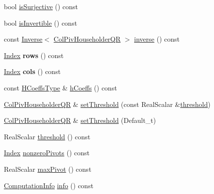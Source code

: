 \begin{DoxyCompactItemize}
bool \hyperlink{group___q_r___module_a87a7d06e0b0479e5b56b19c2a4f56365}{is\+Surjective} () const
\item 
bool \hyperlink{group___q_r___module_a945720f8d683f8ebe97fa807edd3142a}{is\+Invertible} () const
\item 
const \hyperlink{class_eigen_1_1_inverse}{Inverse}$<$ \hyperlink{group___q_r___module_class_eigen_1_1_col_piv_householder_q_r}{Col\+Piv\+Householder\+QR} $>$ \hyperlink{group___q_r___module_a31c45402e74774d9cd13af0e57a6b72f}{inverse} () const
\item 
\mbox{\label{group___q_r___module_a7b149d8acc35378384bd8cd1b7335545}} 
\hyperlink{namespace_eigen_a62e77e0933482dafde8fe197d9a2cfde}{Index} {\bfseries rows} () const
\item 
\mbox{\label{group___q_r___module_a5d8f3537c8589e6dcdec278081d50f3c}} 
\hyperlink{namespace_eigen_a62e77e0933482dafde8fe197d9a2cfde}{Index} {\bfseries cols} () const
\item 
const \hyperlink{class_eigen_1_1internal_1_1_tensor_lazy_evaluator_writable}{H\+Coeffs\+Type} \& \hyperlink{group___q_r___module_ac5943d19aa5fd96340c7df6874fcb1b9}{h\+Coeffs} () const
\item 
\hyperlink{group___q_r___module_class_eigen_1_1_col_piv_householder_q_r}{Col\+Piv\+Householder\+QR} \& \hyperlink{group___q_r___module_ae712cdc9f0e521cfc8061bee58ff55ee}{set\+Threshold} (const Real\+Scalar \&\hyperlink{group___q_r___module_a72276adb1aa11f870f50d0bd58af014d}{threshold})
\item 
\hyperlink{group___q_r___module_class_eigen_1_1_col_piv_householder_q_r}{Col\+Piv\+Householder\+QR} \& \hyperlink{group___q_r___module_a648df14c457ceceb09d933d06d3bdded}{set\+Threshold} (Default\+\_\+t)
\item 
Real\+Scalar \hyperlink{group___q_r___module_a72276adb1aa11f870f50d0bd58af014d}{threshold} () const
\item 
\hyperlink{namespace_eigen_a62e77e0933482dafde8fe197d9a2cfde}{Index} \hyperlink{group___q_r___module_a796610bab81f0527aa1ae440c71f58a4}{nonzero\+Pivots} () const
\item 
Real\+Scalar \hyperlink{group___q_r___module_aac8c43d720170980f582d01494df9e8f}{max\+Pivot} () const
\item 
\hyperlink{group__enums_ga85fad7b87587764e5cf6b513a9e0ee5e}{Computation\+Info} \hyperlink{group___q_r___module_a5c756a789175197cab3eff3a3e479ef2}{info} () const

\end{DoxyCompactItemize}
